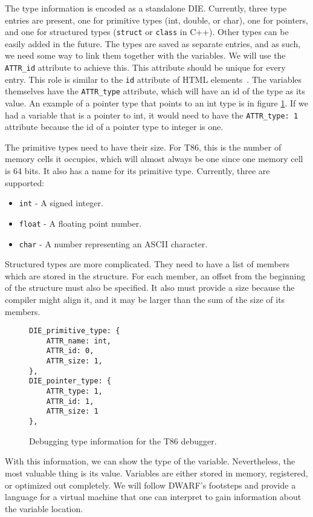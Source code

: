 The type information is encoded as a standalone DIE. Currently, three type
entries are present, one for primitive types (int, double, or char), one for
pointers, and one for structured types (\texttt{struct} or \texttt{class} in
C++). Other types can be easily added in the future. The types are saved as
separate entries, and as such, we need some way to link them together with the
variables. We will use the \verb|ATTR_id| attribute to achieve this. This
attribute should be unique for every entry. This role is similar to the
\texttt{id} attribute of HTML elements~\cite{html4}. The variables themselves
have the \verb|ATTR_type| attribute, which will have an id of the type as its
value. An example of a pointer type that points to an int type is in figure
\ref{fig:t86dbg-types}. If we had a variable that is a pointer to int, it would
need to have the \verb|ATTR_type: 1| attribute because the id of a pointer type
to integer is one.

The primitive types need to have their size. For T86, this is the number of
memory cells it occupies, which will almost always be one since one memory cell
is 64 bits. It also has a name for its primitive type. Currently, three
are supported:
\begin{itemize}
    \item \texttt{int} - A signed integer.
    \item \texttt{float} - A floating point number.
    \item \texttt{char} - A number representing an ASCII character.
\end{itemize}

Structured types are more complicated. They need to have a list of members
which are stored in the structure. For each member, an offset from the
beginning of the structure must also be specified. It also must provide a size
because the compiler might align it, and it may be larger than the sum of the
size of its members.

\begin{figure}
    \begin{lstlisting}
DIE_primitive_type: {
    ATTR_name: int,
    ATTR_id: 0,
    ATTR_size: 1,
},
DIE_pointer_type: {
    ATTR_type: 1,
    ATTR_id: 1,
    ATTR_size: 1
},
    \end{lstlisting}
    \caption{Debugging type information for the T86 debugger.}
    \label{fig:t86dbg-types}
\end{figure}

With this information, we can show the type of the variable. Nevertheless, the
most valuable thing is its value. Variables are either stored in memory,
registered, or optimized out completely. We will follow DWARF's footsteps and
provide a language for a virtual machine that one can interpret to gain
information about the variable location.

